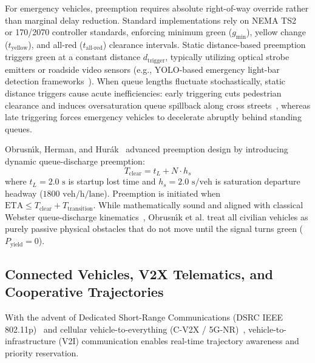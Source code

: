 \documentclass[journal,10pt,twocolumn]{IEEEtran}
\begin{document}
For emergency vehicles, preemption requires absolute right-of-way override rather than marginal delay reduction. Standard implementations rely on NEMA TS2~\cite{nema2016} or 170/2070 controller standards, enforcing minimum green ($g_{\min}$), yellow change ($t_{\text{yellow}}$), and all-red ($t_{\text{all-red}}$) clearance intervals. Static distance-based preemption triggers green at a constant distance $d_{\text{trigger}}$, typically utilizing optical strobe emitters or roadside video sensors (e.g., YOLO-based emergency light-bar detection frameworks~\cite{lamrabet2026}). When queue lengths fluctuate stochastically, static distance triggers cause acute inefficiencies: early triggering cuts pedestrian clearance and induces oversaturation queue spillback along cross streets~\cite{bie2020evp,kang2021preempt,qin2012evp}, whereas late triggering forces emergency vehicles to decelerate abruptly behind standing queues.

Obrusn\'{\i}k, Herman, and Hur\'ak~\cite{obrusnik2020} advanced preemption design by introducing dynamic queue-discharge preemption:
\begin{equation}
T_{\text{clear}} = t_L + N \cdot h_s
\end{equation}
where $t_L = 2.0\text{ s}$ is startup lost time and $h_s = 2.0\text{ s/veh}$ is saturation departure headway ($1800\text{ veh/h/lane}$). Preemption is initiated when $\text{ETA} \le T_{\text{clear}} + T_{\text{transition}}$. While mathematically sound and aligned with classical Webster queue-discharge kinematics~\cite{webster1958,lighthill1955lwr}, Obrusn\'{\i}k et al. treat all civilian vehicles as purely passive physical obstacles that do not move until the signal turns green ($P_{\text{yield}} = 0$).

\subsection{Connected Vehicles, V2X Telematics, and Cooperative Trajectories}
With the advent of Dedicated Short-Range Communications (DSRC IEEE 802.11p)~\cite{kenney2011dsrc} and cellular vehicle-to-everything (C-V2X / 5G-NR)~\cite{abboud2016cv2x,gyawali2020v2x,siegel2018connected}, vehicle-to-infrastructure (V2I) communication enables real-time trajectory awareness and priority reservation. 
\end{document}

